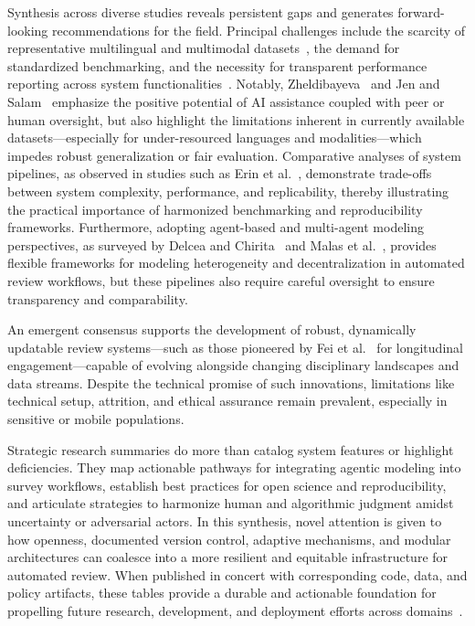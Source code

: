 \documentclass[sigconf]{acmart}
\begin{document}
Synthesis across diverse studies reveals persistent gaps and generates forward-looking recommendations for the field. Principal challenges include the scarcity of representative multilingual and multimodal datasets~\cite{ref108,ref110}, the demand for standardized benchmarking, and the necessity for transparent performance reporting across system functionalities~\cite{ref113,ref114}. Notably, Zheldibayeva~\cite{ref108} and Jen and Salam~\cite{ref110} emphasize the positive potential of AI assistance coupled with peer or human oversight, but also highlight the limitations inherent in currently available datasets—especially for under-resourced languages and modalities—which impedes robust generalization or fair evaluation. Comparative analyses of system pipelines, as observed in studies such as Erin et al.~\cite{ref113}, demonstrate trade-offs between system complexity, performance, and replicability, thereby illustrating the practical importance of harmonized benchmarking and reproducibility frameworks. Furthermore, adopting agent-based and multi-agent modeling perspectives, as surveyed by Delcea and Chirita~\cite{ref114} and Malas et al.~\cite{ref115}, provides flexible frameworks for modeling heterogeneity and decentralization in automated review workflows, but these pipelines also require careful oversight to ensure transparency and comparability.

An emergent consensus supports the development of robust, dynamically updatable review systems—such as those pioneered by Fei et al.~\cite{ref117} for longitudinal engagement—capable of evolving alongside changing disciplinary landscapes and data streams. Despite the technical promise of such innovations, limitations like technical setup, attrition, and ethical assurance remain prevalent, especially in sensitive or mobile populations.

Strategic research summaries do more than catalog system features or highlight deficiencies. They map actionable pathways for integrating agentic modeling into survey workflows, establish best practices for open science and reproducibility, and articulate strategies to harmonize human and algorithmic judgment amidst uncertainty or adversarial actors. In this synthesis, novel attention is given to how openness, documented version control, adaptive mechanisms, and modular architectures can coalesce into a more resilient and equitable infrastructure for automated review. When published in concert with corresponding code, data, and policy artifacts, these tables provide a durable and actionable foundation for propelling future research, development, and deployment efforts across domains~\cite{ref113,ref114,ref115,ref117}.
\end{document}
